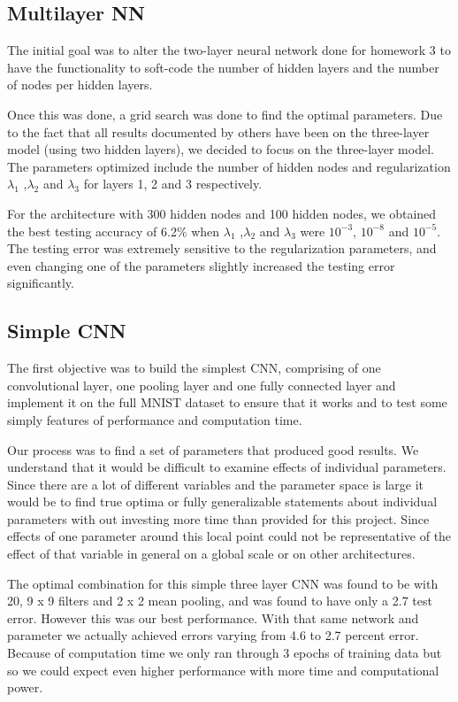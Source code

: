 \documentclass[12pt, twocolumn]{article}
\begin{document}
\subsection{Multilayer NN}
The initial goal was to alter the two-layer neural network done for homework 3 to have the functionality to soft-code the number of hidden layers and the number of nodes per hidden layers.

Once this was done, a grid search was done to find the optimal parameters. Due to the fact that all results documented by others have been on the three-layer model (using two hidden layers), we decided to focus on the three-layer model. The parameters optimized include the number of hidden nodes and regularization $\lambda_1$ ,$\lambda_2$ and $\lambda_3$ for layers 1, 2 and 3 respectively.

For the architecture with 300 hidden nodes and 100 hidden nodes, we obtained the best testing accuracy of 6.2\% when $\lambda_1$ ,$\lambda_2$ and $\lambda_3$ were $10^{-3}$, $10^{-8}$ and $10^{-5}$. The testing error was extremely sensitive to  the regularization parameters, and even changing one of the parameters slightly increased the testing error significantly. 

\subsection{Simple CNN}
The first objective was to build the simplest CNN, comprising of one convolutional layer, one pooling layer and one fully connected layer and implement it on the full MNIST dataset to ensure that it works and to test some simply features of performance and computation time.  

Our process was to find a set of parameters that produced good results. We understand that it would be difficult to examine effects of individual parameters. Since there are a lot of different variables and the parameter space is large it would be to find true optima or fully generalizable statements about individual parameters with out investing more time than provided for this project. Since effects of one parameter around this local point could not be representative of the effect of that variable in general on a global scale or on other architectures. 

The optimal combination for this simple three layer CNN was found to be with 20, 9 x 9 filters and 2 x 2 mean pooling, and was found to have only a 2.7 test error. However this was our best performance. With that same network and parameter we actually achieved errors varying from 4.6 to 2.7 percent error. Because of computation time we only ran through 3 epochs of training data but so we could expect even  higher performance with more time and computational power. 
\end{document}
